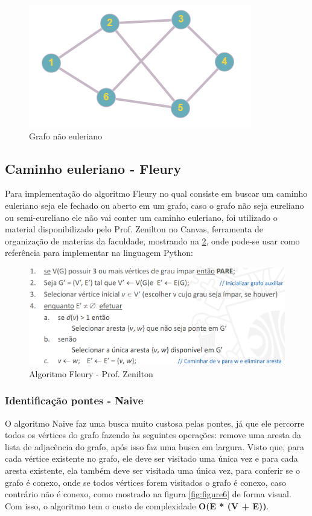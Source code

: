 \begin{figure}[ht]
    \centering
    \includegraphics[width=.2\textwidth]{figuras/not_eurelian.png}
    \caption{Grafo não euleriano}
    \label{fig:figure4}
\end{figure}

\subsection{\esp Caminho euleriano - Fleury}
Para implementação do algoritmo Fleury no qual consiste em buscar um caminho euleriano seja ele fechado ou aberto em um grafo, caso o grafo não seja eureliano ou semi-eureliano ele não vai conter um caminho euleriano, foi utilizado o material disponibilizado pelo Prof. Zenilton no Canvas, ferramenta de organização de materias da faculdade, mostrando na \ref{fig:figure5}, onde pode-se usar como referência para implementar na linguagem Python:

\begin{figure}[ht]
    \centering
    \includegraphics[width=.9\textwidth]{figuras/fleury.png}
    \caption{Algoritmo Fleury - Prof. Zenilton}
    \label{fig:figure5}
\end{figure}

\subsubsection{\esp Identificação pontes - Naive}
O algoritmo Naive faz uma busca muito custosa pelas pontes, já que ele percorre todos os vértices do grafo fazendo às seguintes operações: remove uma aresta da lista de adjacência do grafo, após isso faz uma busca em largura. Visto que, para cada vértice existente no grafo, ele deve ser visitado uma única vez e para cada aresta existente, ela também deve ser visitada uma única vez, para conferir se o grafo é conexo, onde se todos vértices forem visitados o grafo é conexo, caso contrário não é conexo, como mostrado na figura \ref{fig:figure6} de forma visual. Com isso, o algoritmo tem o custo de complexidade \textbf{O(E * (V + E))}.

